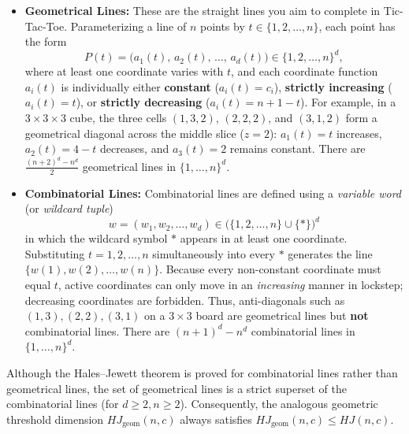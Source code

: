 \documentclass[11pt, a4paper]{article}
\begin{document}
\begin{itemize}
    \item \textbf{Geometrical Lines:} These are the straight lines you aim to complete in Tic-Tac-Toe. Parameterizing a line of $n$ points by $t \in \{1, 2, \dots, n\}$, each point has the form
    \[
    P(t) = \bigl(a_1(t),\, a_2(t),\, \dots,\, a_d(t)\bigr) \in \{1, 2, \dots, n\}^d,
    \]
    where at least one coordinate varies with $t$, and each coordinate function $a_i(t)$ is individually either \textbf{constant} ($a_i(t) = c_i$), \textbf{strictly increasing} ($a_i(t) = t$), or \textbf{strictly decreasing} ($a_i(t) = n + 1 - t$). For example, in a $3 \times 3 \times 3$ cube, the three cells $(1, 3, 2)$, $(2, 2, 2)$, and $(3, 1, 2)$ form a geometrical diagonal across the middle slice ($z = 2$): $a_1(t) = t$ increases, $a_2(t) = 4 - t$ decreases, and $a_3(t) = 2$ remains constant. There are $\frac{(n + 2)^d - n^d}{2}$ geometrical lines in $\{1, \dots, n\}^d$.

    \item \textbf{Combinatorial Lines:} Combinatorial lines are defined using a \emph{variable word} (or \emph{wildcard tuple})
    \[
    w = (w_1, w_2, \dots, w_d) \in \bigl(\{1, 2, \dots, n\} \cup \{*\}\bigr)^d
    \]
    in which the wildcard symbol $*$ appears in at least one coordinate. Substituting $t = 1, 2, \dots, n$ simultaneously into every $*$ generates the line $\{w(1), w(2), \dots, w(n)\}$. Because every non-constant coordinate must equal $t$, active coordinates can only move in an \emph{increasing} manner in lockstep; decreasing coordinates are forbidden. Thus, anti-diagonals such as $(1,3), (2,2), (3,1)$ on a $3 \times 3$ board are geometrical lines but \textbf{not} combinatorial lines. There are $(n + 1)^d - n^d$ combinatorial lines in $\{1, \dots, n\}^d$.
\end{itemize}

Although the Hales--Jewett theorem is proved for combinatorial lines rather than geometrical lines, the set of geometrical lines is a strict superset of the combinatorial lines (for $d \ge 2, n \ge 2$). Consequently, the analogous geometric threshold dimension $HJ_{\mathrm{geom}}(n, c)$ always satisfies $HJ_{\mathrm{geom}}(n, c) \le HJ(n, c)$.
\end{document}
